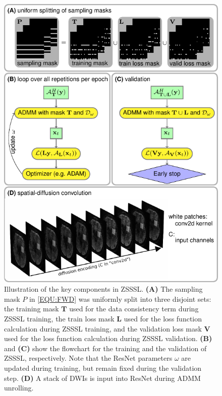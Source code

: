 \documentclass[journal,twoside,web]{ieeecolor}
\begin{document}
	\begin{figure}
		\centering
		\includegraphics[width=\columnwidth]{../figures/fig1.pdf}
		\caption{Illustration of the key components in ZSSSL.
			\textbf{(A)} The sampling mask $P$ in \cref{EQU:FWD} was
			uniformly split into three disjoint sets:
			the training mask $\mathbf{T}$ used for
			the data consistency term during ZSSSL training,
			the train loss mask $\mathbf{L}$ used for
			the loss function calculation during ZSSSL training, and
			the validation loss mask $\mathbf{V}$ used for
			the loss function calculation during ZSSSL validation.
			\textbf{(B)} and \textbf{(C)} show the flowchart
			for the training and the validation of ZSSSL, respectively.
			Note that the ResNet parameters $\omega$ are updated during training,
			but remain fixed during the validation step.
			\textbf{(D)} A stack of DWIs is input into ResNet during ADMM unrolling.}
		\label{FIG:ZSSSL}
	\end{figure}
\end{document}
